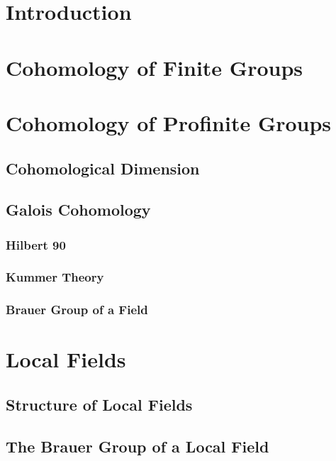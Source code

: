 \documentclass[a4paper, oneside]{memoir}
\begin{document}
\tableofcontents


\chapter*{Introduction}

\chapter{Cohomology of Finite Groups}


\chapter{Cohomology of Profinite Groups}

\section{Cohomological Dimension}
\section{Galois Cohomology}
\subsection{Hilbert 90}
\subsection{Kummer Theory}
\subsection{Brauer Group of a Field}

\chapter{Local Fields}

\section{Structure of Local Fields}
\section{The Brauer Group of a Local Field}
\end{document}
